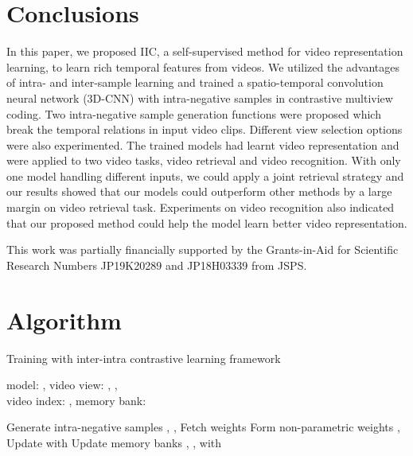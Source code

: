 \documentclass[sigconf]{acmart}
\makeatletter
\let\@algcomment\relax
\newcommand\algcomment[1]{\def\@algcomment{\footnotesize#1}}
\makeatother
\begin{document}
\section{Conclusions}
In this paper, we proposed IIC, a self-supervised method for video representation learning, to learn rich temporal features from videos. We utilized the advantages of intra- and inter-sample learning and trained a spatio-temporal convolution neural network (3D-CNN) with intra-negative samples in contrastive multiview coding. Two intra-negative sample generation functions were proposed which break the temporal relations in input video clips. Different view selection options were also experimented. The trained models had learnt video representation and were applied to two video tasks, video retrieval and video recognition. With only one model handling different inputs, we could apply a joint retrieval strategy and our results showed that our models could outperform other methods by a large margin on video retrieval task. Experiments on video recognition also indicated that our proposed method could help the model learn better video representation.

\begin{acks}
This work was partially financially supported by the Grants-in-Aid for Scientific Research Numbers JP19K20289 and JP18H03339 from JSPS.
\end{acks}




\appendix
\section{Algorithm}
\label{alg}
\begin{algorithm}[ht]
  \caption{Training with inter-intra contrastive learning framework}
  model: , 
  video view: , , \\
  video index: , memory bank: \\
  \algcomment{
    \fontsize{7.2pt}{0em}\selectfont Line 3,6 are the main differences from the baseline method CMC~\cite{tian2019contrastive}.
  }
  \begin{algorithmic}[1]
     \State 
     \State Generate intra-negative samples 
     \State , , 
     \State Fetch weights 
     \State Form non-parametric weights , 
     \State 
     \State Update  with 
     \State Update memory banks , ,  with 
    \EndFor
\end{algorithmic}
\end{algorithm}
\end{document}
